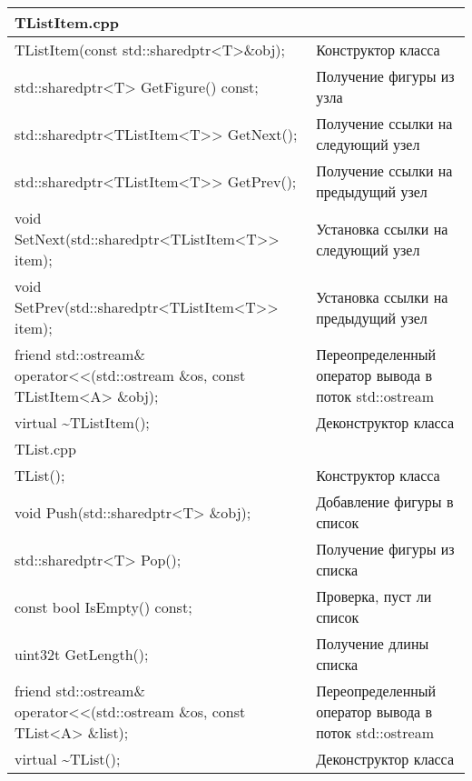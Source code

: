 \begin{longtable}{|p{7.5cm}|p{7.5cm}|}
\rowcolor{lightgray}
\multicolumn{2}{|c|} {TListItem.cpp}\\
\hline
TListItem(const std::sharedptr<T>\&obj);&Конструктор класса\\
\hline
std::sharedptr<T> GetFigure() const;&Получение фигуры из узла\\
\hline
std::sharedptr<TListItem<T>> GetNext();&Получение ссылки на следующий узел\\
\hline
std::sharedptr<TListItem<T>> GetPrev();&Получение ссылки на предыдущий узел\\
\hline
void SetNext(std::sharedptr<TListItem<T>> item);&Установка ссылки на следующий узел\\
\hline
void SetPrev(std::sharedptr<TListItem<T>> item);&Установка ссылки на предыдущий узел\\
\hline
friend std::ostream\& operator<<(std::ostream \&os, const TListItem<A> \&obj);&Переопределенный оператор вывода в поток std::ostream\\
\hline
virtual \textasciitilde TListItem(){};&Деконструктор класса\\
\hline
\rowcolor{lightgray}
\multicolumn{2}{|c|} {TList.cpp}\\
\hline
TList();&Конструктор класса\\
\hline
void Push(std::sharedptr<T> \&obj);&Добавление фигуры в список\\
\hline
std::sharedptr<T> Pop();&Получение фигуры из списка\\
\hline
const bool IsEmpty() const;&Проверка, пуст ли список\\
\hline
uint32t GetLength();&Получение длины списка\\
\hline
friend std::ostream\& operator<<(std::ostream \&os, const TList<A> \&list);&Переопределенный оператор вывода в поток std::ostream\\
\hline
virtual \textasciitilde TList();&Деконструктор класса\\
\hline
\end{longtable}


